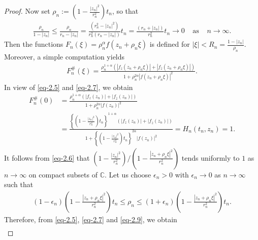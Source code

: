 \documentclass[10pt,a4paper]{amsart}
\begin{document}
\begin{proof}
Now set $\rho_n:=\left(1- \frac{|z_n|^2}{r^2_n}\right)t_n$, so that
\begin{align}\label{eq-2.6}
	\frac{\rho_n}{1-|z_n|}\leq \frac{\rho_n}{r_n -|z_n|}= \frac{(r^2_n -|z_n|^2)}{r^2_n(r_n -|z_n|)}t_n= \frac{(r_n +|z_n|)}{r^2_n} t_n \rightarrow 0 \;\;\;\;\mbox{as} \;\;\;\;n\rightarrow \infty.
\end{align}
Then the functions $F_n(\xi)=\rho^{\alpha}_n f(z_n+\rho_n\xi)$ is defined for $|\xi|<R_n=\frac{1-|z_n|}{\rho_n}$. Moreover, a simple computation yields
\begin{align}\label{eq-2.7}
	F^{\#}_n(\xi)= \frac{\rho^{1+\alpha}_n\left(|f_z(z_n+\rho_n\xi)| + |f_{\overline{z}}(z_n+\rho_n\xi)|\right)}{1+\rho^{2\alpha}_n |f(z_n+\rho_n\xi)|^2}.
\end{align}
In view of \eqref{eq-2.5} and \eqref{eq-2.7}, we obtain
\begin{align}\label{eq-2.8}
	F^{\#}_n(0) \nonumber&= \frac{\rho^{1+\alpha}_n\left(|f_z(z_n)| + |f_{\overline{z}}(z_n)|\right)}{1+\rho^{2\alpha}_n |f(z_n)|^2}\\&= \frac{\left\{\left(1- \frac{|z_n|^2}{r^2_n}\right)t_n \right\} ^{1+\alpha}\left(|f_z(z_n)| + |f_{\overline{z}}(z_n)|\right)} {1+\left\{\left(1- \frac{|z_n|^2}{r^2_n}\right)t_n \right\}^{2\alpha} |f(z_n)|^2} = H_n(t_n,z_n)=1.
\end{align}
It follows from \eqref{eq-2.6} that $\left(1- \frac{|z_n|^2}{r^2_n} \right)/\left(1- \frac{|z_n+ \rho_n\xi|^2}{r^2_n}\right)$ tends uniformly to $1$ as $n\rightarrow\infty$ on compact subsets of $\mathbb{C}$. Let us choose $\epsilon_n>0$ with $\epsilon_n\rightarrow 0$ as $n\rightarrow\infty$ such that
\begin{align}\label{eq-2.9}
	(1-\epsilon_n)\left(1- \frac{|z_n+ \rho_n\xi|^2}{r^2_n}\right)t_n \leq\rho_n\leq (1+\epsilon_n)\left(1- \frac{|z_n+ \rho_n\xi|^2} {r^2_n}\right)t_n.
\end{align}
Therefore, from \eqref{eq-2.5}, \eqref{eq-2.7} and \eqref{eq-2.9}, we obtain
\begin{align}\label{eq-2.10}

\end{align}
\end{proof}
\end{document}

